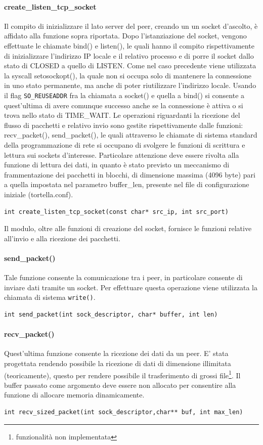 \paragraph{create\_listen\_tcp\_socket} 
Il compito di inizializzare il lato server del peer, creando un un socket d'ascolto, è affidato alla funzione sopra riportata. Dopo l'istanziazione del socket, vengono effettuate le chiamate bind() e listen(), le quali hanno il compito rispettivamente di inizializzare l'indirizzo IP locale e il relativo processo e di porre il socket dallo stato di CLOSED a quello di LISTEN. Come nel caso precedente viene utilizzata la syscall setosockopt(), la quale non si occupa solo di mantenere la connessione in uno stato permanente, ma anche di poter riutilizzare l'indirizzo locale. Usando il flag \texttt{SO\_REUSEADDR} fra la chiamata a socket() e quella a bind() si consente a quest'ultima di avere comunque successo anche se la connessione è attiva o si trova nello stato di TIME\_WAIT.  
Le operazioni riguardanti la ricezione del flusso di pacchetti e relativo invio  sono gestite rispettivamente dalle funzioni: recv\_packet(), send\_packet(), le quali attraverso le chiamate di sistema standard della programmazione di rete si occupano di svolgere le funzioni di scrittura e lettura sui sockets d'interesse. Particolare attenzione deve essere rivolta alla funzione di lettura dei dati, in quanto è stato previsto un meccanismo di frammentazione dei pacchetti in blocchi, di dimensione massima (4096 byte) pari a quella impostata nel parametro buffer\_len, presente nel file di configurazione iniziale (tortella.conf).
\begin{lstlisting}
int create_listen_tcp_socket(const char* src_ip, int src_port)
\end{lstlisting}
Il modulo, oltre alle funzioni di creazione del socket, fornisce le funzioni relative all'invio e alla ricezione dei pacchetti.
\paragraph{send\_packet()}
Tale funzione consente la comunicazione tra i peer, in particolare consente di inviare dati tramite un socket. Per effettuare questa operazione viene utilizzata la chiamata di sistema \texttt{write()}.
\begin{lstlisting}
int send_packet(int sock_descriptor, char* buffer, int len)
\end{lstlisting}
\paragraph{recv\_packet()}
Quest'ultima funzione consente la ricezione dei dati da un peer. E' stata progettata rendendo possibile la ricezione di dati di dimensione illimitata (teoricamente), questo per rendere possibile il trasferimento di grossi file\footnote{funzionalità non implementata}. Il buffer passato come argomento deve essere non allocato per consentire alla funzione di allocare memoria dinamicamente.
\begin{lstlisting}
int recv_sized_packet(int sock_descriptor,char** buf, int max_len)
\end{lstlisting}
